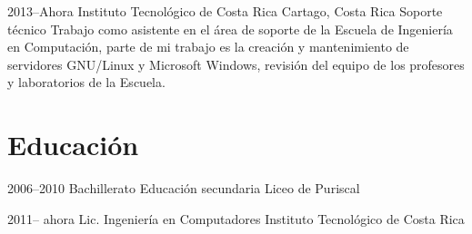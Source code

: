 \documentclass[]{friggeri-cv} %
\begin{document}
\begin{entrylist}


\entry 
{2013--Ahora}
{Instituto Tecnológico de Costa Rica}
{Cartago, Costa Rica}%
{Soporte técnico}
{
Trabajo como asistente en el área de soporte de la Escuela de Ingeniería en Computación, parte de mi trabajo es la creación y mantenimiento de servidores GNU/Linux y Microsoft Windows, revisión del equipo de los profesores y laboratorios de la Escuela.
}


%
%
%
%
%
%
%
%
%
%
%
%
%
%
%
%
%


\end{entrylist}


\section{Educación}

\begin{entrylist} 


\entry
{2006--2010}
{Bachillerato {\normalfont Educación secundaria}}
{Liceo de Puriscal}
{
}

\entry
{2011-- ahora}  
{Lic. Ingeniería en Computadores}
{Instituto Tecnológico de Costa Rica}
{
}

\end{entrylist}
\end{document}
